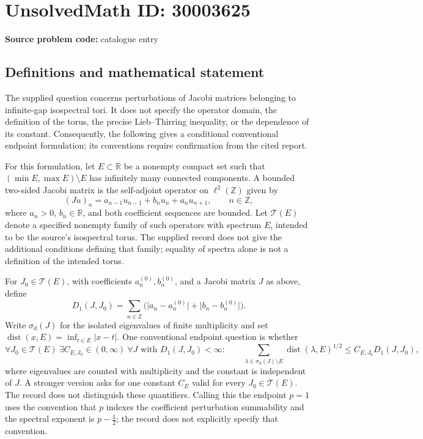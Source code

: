 \documentclass[11pt]{article}
\newcommand{\Z}{\mathbb{Z}}
\newcommand{\R}{\mathbb{R}}
\begin{document}
\section*{UnsolvedMath ID: 30003625}
\textbf{Source problem code:} catalogue entry
\subsection{Definitions and mathematical statement}
The supplied question concerns perturbations of Jacobi matrices belonging to infinite-gap isospectral tori. It does not specify the operator domain, the definition of the torus, the precise Lieb--Thirring inequality, or the dependence of its constant. Consequently, the following gives a conditional conventional endpoint formulation; its conventions require confirmation from the cited report.

For this formulation, let \(E\subset\R\) be a nonempty compact set such that \((\min E,\max E)\setminus E\) has infinitely many connected components. A bounded two-sided Jacobi matrix is the self-adjoint operator on \(\ell^2(\Z)\) given by
\[
(Ju)_n=a_{n-1}u_{n-1}+b_nu_n+a_nu_{n+1},\qquad n\in\Z,
\]
where \(a_n>0\), \(b_n\in\R\), and both coefficient sequences are bounded. Let \(\mathcal T(E)\) denote a specified nonempty family of such operators with spectrum \(E\), intended to be the source's isospectral torus. The supplied record does not give the additional conditions defining that family; equality of spectra alone is not a definition of the intended torus.

For \(J_0\in\mathcal T(E)\), with coefficients \(a_n^{(0)},b_n^{(0)}\), and a Jacobi matrix \(J\) as above, define
\[
D_1(J,J_0)=\sum_{n\in\Z}\bigl(\lvert a_n-a_n^{(0)}\rvert+\lvert b_n-b_n^{(0)}\rvert\bigr).
\]
Write \(\sigma_{\mathrm d}(J)\) for the isolated eigenvalues of finite multiplicity and set \(\operatorname{dist}(x,E)=\inf_{t\in E}|x-t|\). One conventional endpoint question is whether
\[
\forall J_0\in\mathcal T(E)\ \exists C_{E,J_0}\in(0,\infty)\ \forall J\text{ with }D_1(J,J_0)<\infty:\qquad
\sum_{\lambda\in\sigma_{\mathrm d}(J)\setminus E}
\operatorname{dist}(\lambda,E)^{1/2}
\le C_{E,J_0}D_1(J,J_0),
\]
where eigenvalues are counted with multiplicity and the constant is independent of \(J\). A stronger version asks for one constant \(C_E\) valid for every \(J_0\in\mathcal T(E)\). The record does not distinguish these quantifiers. Calling this the endpoint \(p=1\) uses the convention that \(p\) indexes the coefficient perturbation summability and the spectral exponent is \(p-\tfrac12\); the record does not explicitly specify that convention.
\end{document}
